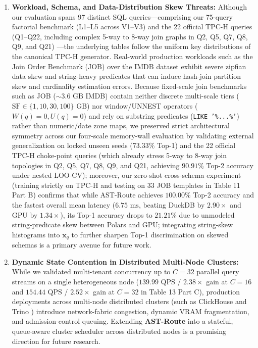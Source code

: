 \documentclass[10pt,a4paper]{article}
\begin{document}
\begin{enumerate}[leftmargin=1.5em,itemsep=2pt]
    \item \textbf{Workload, Schema, and Data-Distribution Skew Threats:} Although our evaluation spans 97 distinct SQL queries---comprising our 75-query factorial benchmark (L1--L5 across V1--V3) and the 22 official TPC-H queries (Q1--Q22, including complex 5-way to 8-way join graphs in Q2, Q5, Q7, Q8, Q9, and Q21) \cite{tpc2022tpch,dreseler2020quantifying}---the underlying tables follow the uniform key distributions of the canonical TPC-H generator. Real-world production workloads such as the Join Order Benchmark (JOB) \cite{leis2015job} over the IMDB dataset exhibit severe zipfian data skew and string-heavy predicates that can induce hash-join partition skew and cardinality estimation errors. Because fixed-scale join benchmarks such as JOB ($\sim 3.6\text{ GB}$ IMDB) contain neither discrete multi-scale tiers ($\text{SF} \in \{1, 10, 30, 100\}\text{ GB}$) nor window/UNNEST operators ($W(q)=0, U(q)=0$) and rely on substring predicates (\texttt{LIKE '\%...\%'}) rather than numeric/date zone maps, we preserved strict architectural symmetry across our four-scale memory-wall evaluation by validating external generalization on locked unseen seeds ($73.33\%$ Top-1) and the 22 official TPC-H choke-point queries (which already stress 5-way to 8-way join topologies in Q2, Q5, Q7, Q8, Q9, and Q21, achieving $90.91\%$ Top-2 accuracy under nested LOO-CV); moreover, our zero-shot cross-schema experiment (training strictly on TPC-H and testing on 33 JOB templates in Table 11 Part B) confirms that while AST-Route achieves $100.00\%$ Top-2 accuracy and the fastest overall mean latency ($6.75\text{ ms}$, beating DuckDB by $2.90\times$ and GPU by $1.34\times$), its Top-1 accuracy drops to $21.21\%$ due to unmodeled string-predicate skew between Polars and GPU; integrating string-skew histograms into $\mathbf{x}_q$ to further sharpen Top-1 discrimination on skewed schemas is a primary avenue for future work.
    \item \textbf{Dynamic State Contention in Distributed Multi-Node Clusters:} While we validated multi-tenant concurrency up to $C=32$ parallel query streams on a single heterogeneous node ($139.99\text{ QPS}$ / $2.38\times$ gain at $C=16$ and $154.44\text{ QPS}$ / $2.52\times$ gain at $C=32$ in Table 13 Part C), production deployments across multi-node distributed clusters (such as ClickHouse \cite{schulze2024clickhouse} and Trino \cite{sethi2019presto}) introduce network-fabric congestion, dynamic VRAM fragmentation, and admission-control queuing. Extending \textbf{AST-Route} into a stateful, queue-aware cluster scheduler across distributed nodes is a promising direction for future research.
\end{enumerate}
\end{document}
